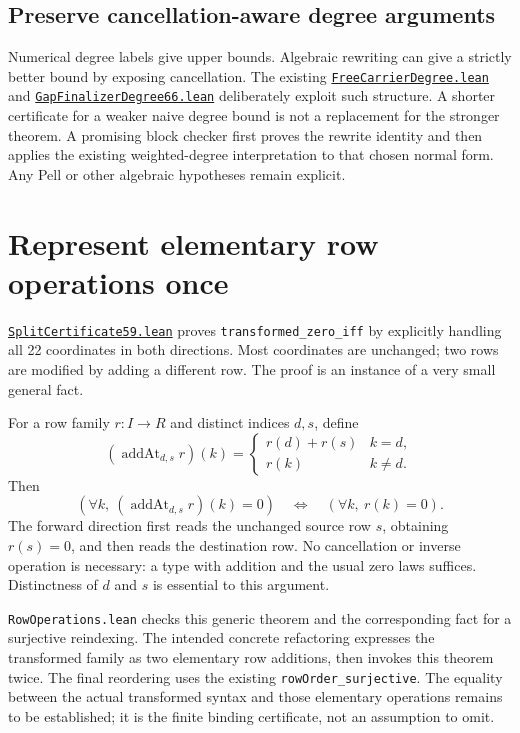 \documentclass[11pt,letterpaper]{article}
\newcommand{\code}[1]{\nolinkurl{#1}}
\newcommand{\src}[2]{\href{https://github.com/VladimirReshetnikov/ProveIt/blob/60e9c5d620c6c387d932876cfa2d9376f64ea56c/Computability/DiophantineConsistency/Lean/DiophantineConsistency/#1.lean}{\code{#1.lean}}#2}
\begin{document}
\subsection{Preserve cancellation-aware degree arguments}

Numerical degree labels give upper bounds. Algebraic rewriting can give a
strictly better bound by exposing cancellation. The existing
\src{FreeCarrierDegree}{ and }
\src{GapFinalizerDegree66}{ deliberately exploit such structure.}
A shorter certificate for a weaker naive degree bound is not a replacement
for the stronger theorem. A promising block checker first proves the rewrite
identity and then applies the existing weighted-degree interpretation to that
chosen normal form. Any Pell or other algebraic hypotheses remain explicit.

\section{Represent elementary row operations once}

\src{SplitCertificate59}{ proves \code{transformed_zero_iff} by explicitly
handling all 22 coordinates in both directions.}
Most coordinates are unchanged; two rows are modified by adding a different
row. The proof is an instance of a very small general fact.

For a row family $r:I\to R$ and distinct indices $d,s$, define
\[
 (\operatorname{addAt}_{d,s}r)(k)=
 \begin{cases}r(d)+r(s)&k=d,\\r(k)&k\ne d.\end{cases}
\]
Then
\[
 (\forall k,\ (\operatorname{addAt}_{d,s}r)(k)=0)
 \quad\Longleftrightarrow\quad (\forall k,\ r(k)=0).
\]
The forward direction first reads the unchanged source row $s$, obtaining
$r(s)=0$, and then reads the destination row. No cancellation or inverse
operation is necessary: a type with addition and the usual zero laws suffices.
Distinctness of $d$ and $s$ is essential to this argument.

\code{RowOperations.lean} checks this generic theorem and the corresponding
fact for a surjective reindexing. The intended concrete refactoring expresses
the transformed family as two elementary row additions, then invokes this
theorem twice. The final reordering uses the existing
\code{rowOrder_surjective}. The equality between the actual transformed
syntax and those elementary operations remains to be established; it is the
finite binding certificate, not an assumption to omit.
\end{document}
